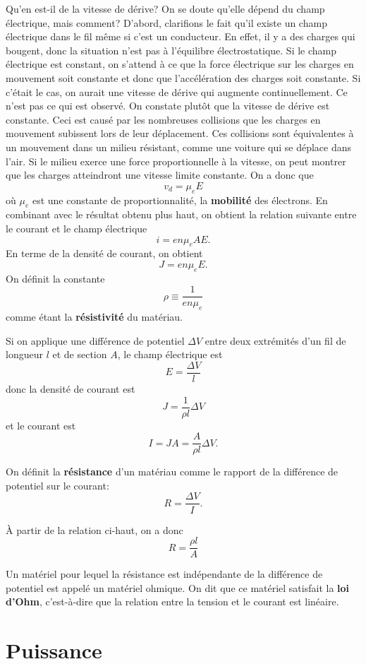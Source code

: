 Qu'en est-il de la vitesse de dérive? On se doute qu'elle dépend du champ
électrique, mais comment? D'abord, clarifions le fait qu'il existe un champ
électrique dans le fil même si c'est un conducteur. En effet, il y a des
charges qui bougent, donc la situation n'est pas à l'équilibre électrostatique.
Si le champ électrique est constant, on s'attend à ce que la force électrique
sur les charges en mouvement soit constante et donc que l'accélération des
charges soit constante. Si c'était le cas, on aurait une vitesse de dérive qui
augmente continuellement. Ce n'est pas ce qui est observé. On constate plutôt
que la vitesse de dérive est constante. Ceci est causé par les nombreuses
collisions que les charges en mouvement subissent lors de leur déplacement. Ces
collisions sont équivalentes à un mouvement dans un milieu résistant, comme une
voiture qui se déplace dans l'air. Si le milieu exerce une force
proportionnelle à la vitesse, on peut montrer que les charges atteindront une
vitesse limite constante. On a donc que
\[
  v_d = \mu_e E
\]
où $\mu_e$ est une constante de proportionnalité, la \textbf{mobilité} des
électrons. En combinant avec le résultat obtenu plus haut, on obtient la
relation suivante entre le courant et le champ électrique
\[
  i = en\mu_e AE.
\]
En terme de la densité de courant, on obtient
\[
  J = en\mu_e E.
\]
On définit la constante
\[
  \rho \equiv \frac{1}{en\mu_e}
\]
comme étant la \textbf{résistivité} du matériau.


Si on applique une différence de potentiel $\Delta V$ entre deux extrémités
d'un fil de longueur $l$ et de section $A$, le champ électrique est
$$E = \frac{\Delta V}{l}$$
donc la densité de courant est
$$J = \frac{1}{\rho l} \Delta V$$
et le courant est
$$I = JA = \frac{A}{\rho l} \Delta V.$$

On définit la \textbf{résistance} d'un matériau comme le rapport de la
différence de potentiel sur le courant:
\[
  R = \frac{\Delta V}{I}.
\]

À partir de la relation ci-haut, on a donc
\[
  R = \frac{\rho l}{A}
\]

Un matériel pour lequel la résistance est indépendante de la différence de
potentiel est appelé un matériel ohmique. On dit que ce matériel satisfait la
\textbf{loi d'Ohm}, c'est-à-dire que la relation entre la tension et le courant
est linéaire.



\section{Puissance}

